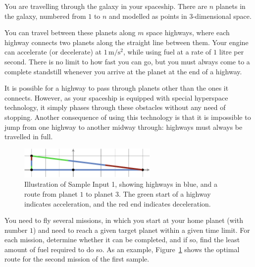 

\newcommand{\maxn}{10^5}
\newcommand{\maxc}{10^3}

You are travelling through the galaxy in your spaceship.
There are $n$ planets in the galaxy, numbered from $1$ to $n$ and modelled as points in $3$-dimensional space.

You can travel between these planets along $m$ space highways, where each highway connects two planets along the straight line between them.
Your engine can accelerate (or decelerate) at $1\,\textrm{m}/\textrm{s}^2$, while using fuel at a rate of $1$ litre per second.
There is no limit to how fast you can go, but you must always come to a complete
standstill whenever you arrive at the planet at the end of a highway.

It is possible for a highway to pass through planets other than the ones it connects.
However, as your spaceship is equipped with special hyperspace technology, it simply phases through these obstacles without any need of stopping.
Another consequence of using this technology is that it is impossible to jump from one highway to another midway through: highways must always be travelled in full.

\begin{figure}[!h]
  \centering
  \includegraphics[width=0.6\textwidth]{sample1.pdf}
  \caption{Illustration of Sample Input 1, showing highways in blue, and a
    route from planet $1$ to planet $3$.
    The green start of a highway indicates acceleration,
    and the red end indicates deceleration.}
  \label{fig:galaxy}
\end{figure}

You need to fly several missions, in which you start at your home planet (with number $1$) and need to reach a given target planet within a given time limit.
For each mission, determine whether it can be completed, and if so, find the
least amount of fuel required to do so.
As an example, Figure~\ref{fig:galaxy} shows the optimal route for the second mission of the first sample.

